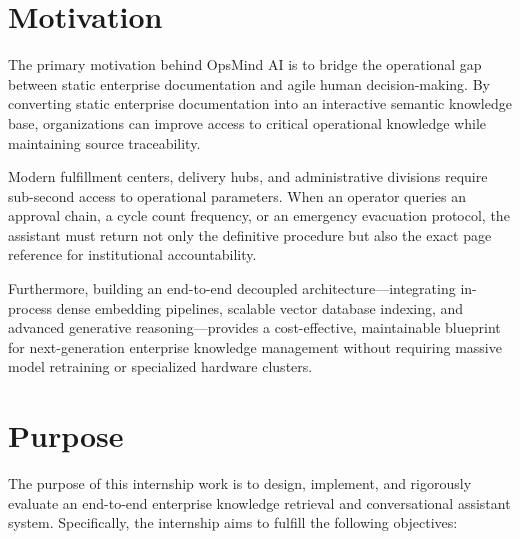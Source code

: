 \section{Motivation}
\label{sec:intro_motivation}

The primary motivation behind OpsMind AI is to bridge the operational gap between static enterprise documentation and agile human decision-making. By converting static enterprise documentation into an interactive semantic knowledge base, organizations can improve access to critical operational knowledge while maintaining source traceability.

Modern fulfillment centers, delivery hubs, and administrative divisions require sub-second access to operational parameters. When an operator queries an approval chain, a cycle count frequency, or an emergency evacuation protocol, the assistant must return not only the definitive procedure but also the exact page reference for institutional accountability. 

Furthermore, building an end-to-end decoupled architecture—integrating in-process dense embedding pipelines, scalable vector database indexing, and advanced generative reasoning—provides a cost-effective, maintainable blueprint for next-generation enterprise knowledge management without requiring massive model retraining or specialized hardware clusters.

\section{Purpose}
\label{sec:intro_purpose}

The purpose of this internship work is to design, implement, and rigorously evaluate an end-to-end enterprise knowledge retrieval and conversational assistant system. Specifically, the internship aims to fulfill the following objectives:

